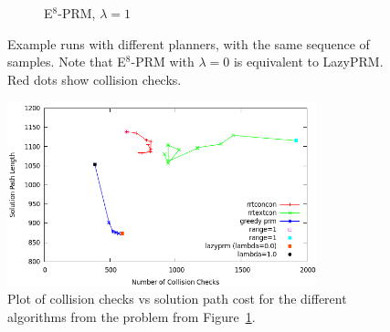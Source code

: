 \begin{figure}
\begin{subfigure}[b]{0.3\textwidth}
      \caption{E$^8$-PRM, $\lambda=1$}
   \end{subfigure}%
   \caption{Example runs with different planners,
      with the same sequence of samples.
      Note that E$^8$-PRM with $\lambda=0$ is equivalent to LazyPRM.
      Red dots show collision checks.}
   \label{fig:compare-2d-rrtc1-vis}
\end{figure}

\begin{figure}
\centering
\includegraphics[width=0.8\textwidth]{figs/compare-2d-rrtc1-medians.png}
\caption{Plot of collision checks vs solution path cost for the
   different algorithms from the problem from
   Figure~\ref{fig:compare-2d-rrtc1-vis}.}
\end{figure}

